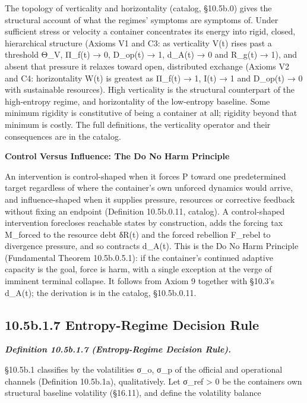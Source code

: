 \documentclass[
]{article}
\begin{document}
The topology of verticality and horizontality (catalog, §10.5b.0) gives
the structural account of what the regimes' symptoms are symptoms of.
Under sufficient stress or velocity a container concentrates its energy
into rigid, closed, hierarchical structure (Axioms V1 and C3: as
verticality V(t) rises past a threshold Θ\_V, Π\_f(t) → 0, D\_op(t) → 1,
d\_A(t) → 0 and R\_g(t) → 1), and absent that pressure it relaxes toward
open, distributed exchange (Axioms V2 and C4: horizontality W(t) is
greatest as Π\_f(t) → 1, I(t) → 1 and D\_op(t) → 0 with sustainable
resources). High verticality is the structural counterpart of the
high-entropy regime, and horizontality of the low-entropy baseline. Some
minimum rigidity is constitutive of being a container at all; rigidity
beyond that minimum is costly. The full definitions, the verticality
operator and their consequences are in the catalog.

\textbf{Control Versus Influence: The Do No Harm Principle}

An intervention is control-shaped when it forces P toward one
predetermined target regardless of where the container's own unforced
dynamics would arrive, and influence-shaped when it supplies pressure,
resources or corrective feedback without fixing an endpoint (Definition
10.5b.0.11, catalog). A control-shaped intervention forecloses reachable
states by construction, adds the forcing tax M\_forced to the resource
debt δR(t) and the forced rebellion F\_rebel to divergence pressure, and
so contracts d\_A(t). This is the Do No Harm Principle (Fundamental
Theorem 10.5b.0.5.1): if the container's continued adaptive capacity is
the goal, force is harm, with a single exception at the verge of
imminent terminal collapse. It follows from Axiom 9 together with
§10.3's d\_A(t); the derivation is in the catalog, §10.5b.0.11.

\hypertarget{b.1.7-entropy-regime-decision-rule}{%
\subsection{10.5b.1.7 Entropy-Regime Decision
Rule}\label{b.1.7-entropy-regime-decision-rule}}

\emph{\textbf{Definition 10.5b.1.7 (Entropy-Regime Decision Rule).}}

§10.5b.1 classifies by the volatilities σ\_o, σ\_p of the official and
operational channels (Definition 10.5b.1a), qualitatively. Let σ\_ref
\textgreater{} 0 be the container\textquotesingle s own structural
baseline volatility (§16.11), and define the volatility balance
\end{document}
